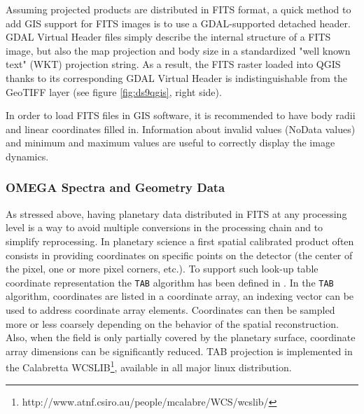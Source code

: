 Assuming projected products are distributed in FITS format, a quick method to add GIS support for
FITS images is to use a GDAL-supported detached header.
GDAL Virtual Header files simply describe the internal structure of a FITS image, but
also the map projection and body size in a standardized "well known text"
(WKT) projection string.
As a result, the FITS raster loaded into QGIS thanks to its corresponding GDAL Virtual Header
is indistinguishable from the GeoTIFF layer (see figure \ref{fig:ds9qgis}, right side).

In order to load FITS files in GIS software, it is recommended to have
body radii and linear coordinates filled in.
Information about invalid values (NoData values) and minimum and maximum values are useful
to correctly display the image dynamics.

\subsubsection{OMEGA Spectra and Geometry Data}
As stressed above, having planetary data distributed in FITS at any processing level is
a way to avoid multiple conversions in the processing chain and to simplify reprocessing.
In planetary science a first spatial calibrated product often consists in providing coordinates
on specific points on the detector (the center of the pixel, one or more pixel corners, etc.).
To support such look-up table coordinate representation the \texttt{TAB} algorithm
has been defined in \citet{wcsspectral}.
In the \texttt{TAB} algorithm, coordinates are listed in a coordinate array, an indexing vector
can be used to address coordinate array elements.
Coordinates can then be sampled more or less coarsely depending on the behavior of the spatial
reconstruction.
Also, when the field is only partially covered by the planetary surface, coordinate array
dimensions can be significantly reduced. 
TAB projection is implemented in the Calabretta WCSLIB\footnote{http://www.atnf.csiro.au/people/mcalabre/WCS/wcslib/},
available in all major linux distribution.

